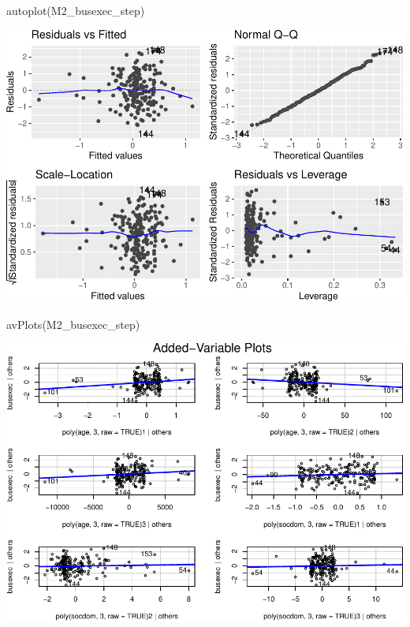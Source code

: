 \documentclass[
]{article}
\newenvironment{Shaded}{\begin{snugshade}}{\end{snugshade}}
\newcommand{\FunctionTok}[1]{\textcolor[rgb]{0.00,0.00,0.00}{#1}}
\newcommand{\NormalTok}[1]{#1}
\begin{document}
\begin{Shaded}
\begin{Highlighting}[]
\FunctionTok{autoplot}\NormalTok{(M2\_busexec\_step)}
\end{Highlighting}
\end{Shaded}

\includegraphics{HW5-Trinath-Sai-Subhash-Reddy-Pittala_files/figure-latex/unnamed-chunk-20-1.pdf}

\begin{Shaded}
\begin{Highlighting}[]
\FunctionTok{avPlots}\NormalTok{(M2\_busexec\_step)}
\end{Highlighting}
\end{Shaded}

\includegraphics{HW5-Trinath-Sai-Subhash-Reddy-Pittala_files/figure-latex/unnamed-chunk-20-2.pdf}
\end{document}
